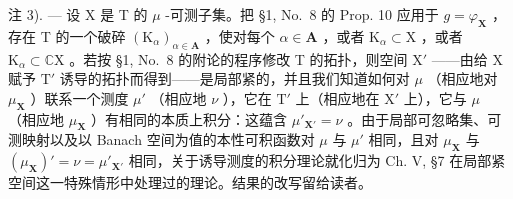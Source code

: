 注 3). --- 设 X 是 T 的 \(\mu\) -可测子集。把 §1, No.~8 的 Prop. 10 应用于 \(g = \varphi_{\mathbf{X}}\) ，存在 T 的一个破碎 \((\mathrm{K}_{\alpha})_{\alpha \in \mathbf{A}}\) ，使对每个 \(\alpha \in \mathbf{A}\) ，或者 \(\mathrm{K}_{\alpha} \subset \mathrm{X}\) ，或者 \(\mathrm{K}_{\alpha} \subset \mathbb{C}\mathrm{X}\) 。若按 §1, No.~8 的附论的程序修改 T 的拓扑，则空间 \(\mathrm{X}'\) ——由给 X 赋予 \(\mathrm{T}'\) 诱导的拓扑而得到——是局部紧的，并且我们知道如何对 \(\mu\) （相应地对 \(\mu_{\mathbf{X}}\) ）联系一个测度 \(\mu'\) （相应地 \(\nu\) ），它在 \(\mathrm{T}'\) 上（相应地在 \(\mathrm{X}'\) 上），它与 \(\mu\) （相应地 \(\mu_{\mathbf{X}}\) ）有相同的本质上积分：这蕴含 \(\mu'_{\mathbf{X}'} = \nu\) 。由于局部可忽略集、可测映射以及以 Banach 空间为值的本性可积函数对 \(\mu\) 与 \(\mu'\) 相同，且对 \(\mu_{\mathbf{X}}\) 与 \((\mu_{\mathbf{X}})' = \nu = \mu'_{\mathbf{X}'}\) 相同，关于诱导测度的积分理论就化归为 Ch. V, §7 在局部紧空间这一特殊情形中处理过的理论。结果的改写留给读者。
